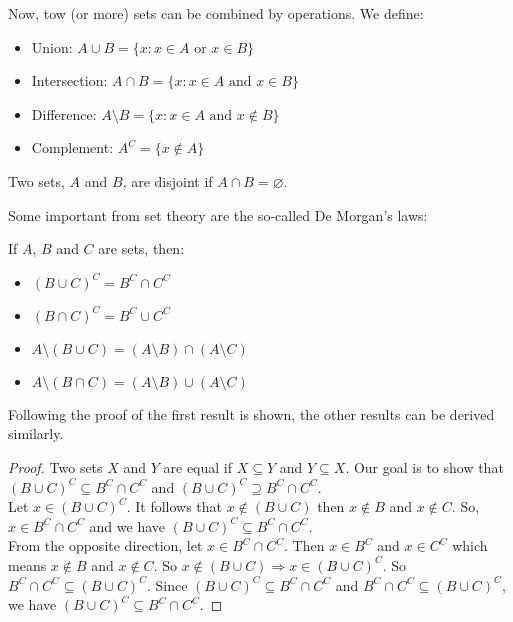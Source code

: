 Now, tow (or more) sets can be combined by operations. We define:

\begin{itemize}
    \item Union: $A \cup B = \{ x: x \in A \text{ or } x \in B\}$
    \item Intersection: $A \cap B = \{ x: x \in A \text{ and } x \in B\}$
    \item Difference: $A \setminus B = \{ x : x \in A \text { and } x \notin B\}$
    \item Complement: $A^C = \{ x \notin A \}$
\end{itemize}

\begin{definition}
    Two sets, $A$ and $B$, are disjoint if $A \cap B = \varnothing$.
\end{definition}

Some important from set theory are the so-called De Morgan's laws:

\begin{theorem}
    If $A$, $B$ and $C$ are sets, then:
    \begin{itemize}
        \item $(B \cup C)^C = B^C \cap C^C$
        \item $(B \cap C)^C = B^C \cup C^C$
        \item $A \setminus (B \cup C) = (A \setminus B) \cap (A \setminus C)$
        \item $A \setminus (B \cap C) = (A \setminus B) \cup (A \setminus C)$
    \end{itemize}
\end{theorem}

Following the proof of the first result is shown, the other results can be derived similarly.

\begin{proof}
    Two sets $X$ and $Y$ are equal if $X \subseteq Y$ and $Y \subseteq X$. Our goal is to show that $(B \cup C)^C \subseteq B^C \cap C^C$ and $(B \cup C)^C \supseteq B^C \cap C^C$. \\
    Let $x \in (B \cup C)^C$. It follows that $x \notin (B \cup C)$ then $x \notin B$ and $x \notin C$. So, $x \in B^C \cap C^C$ and we have $(B \cup C)^C \subseteq B^C \cap C^C$. \\
    From the opposite direction, let  $x \in B^C \cap C^C$. Then $x \in B^C$ and $x \in C^C$ which means $x \notin B$ and $x \notin C$. So $x \notin (B \cup C) \Rightarrow x \in (B \cup C)^C$. So $B^C \cap C^C \subseteq (B \cup C)^C$.
    Since $(B \cup C)^C \subseteq B^C \cap C^C$ and $B^C \cap C^C \subseteq (B \cup C)^C$, we have $(B \cup C)^C \subseteq B^C \cap C^C$.
\end{proof}


